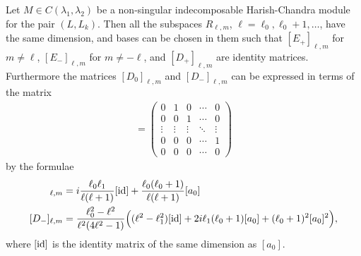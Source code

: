 \begin{theorem}
  Let $M\in C(\lambda_1,\lambda_2)$ be a non-singular indecomposable Harish-Chandra module for the pair $(L,L_k)$. Then all the subspaces $R_{\ell,m}$, $\ell=\ell_0,\ell_0+1,\dotsc$, have the same dimension, and bases can be chosen in them such that $[E_+]_{\ell,m}$ for $m\neq\ell$, $[E_-]_{\ell,m}$ for $m\neq -\ell$, and $[D_+]_{\ell,m}$ are identity matrices. Furthermore the matrices $[D_0]_{\ell,m}$ and $[D_-]_{\ell,m}$ can be expressed in terms of the matrix
  \begin{align*}
    [a_0] =
    \begin{pmatrix}
      0 & 1 & 0 & \cdots & 0 \\
      0 & 0 & 1 & \cdots & 0 \\
      \vdots & \vdots & \vdots & \ddots & \vdots \\
      0 & 0 & 0 & \cdots & 1 \\
      0 & 0 & 0 & \cdots & 0 
    \end{pmatrix}
  \end{align*}
  by the formulae
  \begin{align*}
    [D_0]_{\ell,m} &= i \dfrac{\ell_0\ell_1}{\ell(\ell+1)}[\id] + \dfrac{\ell_0(\ell_0+1)}{\ell(\ell+1)}[a_0] \\
    [D_-]_{\ell,m} &= \dfrac{\ell_0^2-\ell^2}{\ell^2(4\ell^2-1)}\Bigl( (\ell^2-\ell_1^2)[\id] + 2i\ell_1(\ell_0+1)[a_0] + (\ell_0+1)^2[a_0]^2 \Bigr),
  \end{align*}
  where $[\operatorname{id}]$ is the identity matrix of the same dimension as $[a_0]$. 
\end{theorem}
